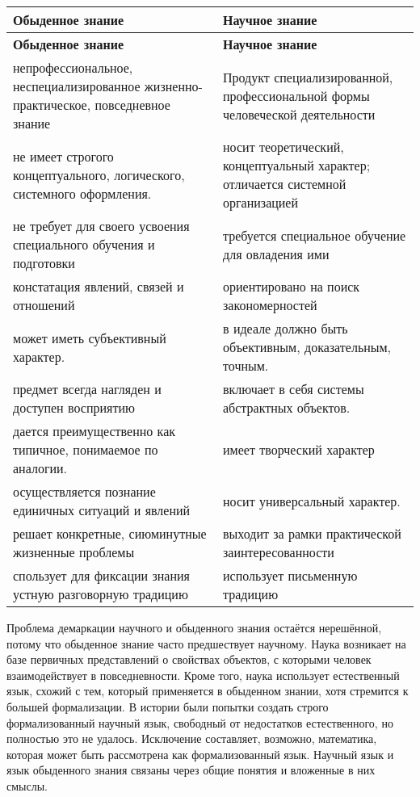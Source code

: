 \begin{longtable}{|>{\raggedright\arraybackslash}p{7cm}|>{\raggedright\arraybackslash}p{7cm}|}
\hline
\textbf{Обыденное знание} & \textbf{Научное знание} \\
\hline
\endfirsthead

\hline
\textbf{Обыденное знание} & \textbf{Научное знание} \\
\hline
\endhead

непрофессиональное, неспециализированное жизненно-практическое, повседневное знание & Продукт специализированной, профессиональной формы человеческой деятельности \\
\hline
не имеет строгого концептуального, логического, системного оформления. & носит теоретический, концептуальный характер; отличается системной организацией \\
\hline
не требует для своего усвоения специального обучения и подготовки & требуется специальное обучение для овладения ими\\
\hline
констатация явлений, связей и отношений & ориентировано на поиск закономерностей \\
\hline
может иметь субъективный характер. & в идеале должно быть объективным, доказательным, точным. \\
\hline
предмет всегда нагляден и доступен восприятию & включает в себя системы абстрактных объектов. \\
\hline
дается преимущественно как типичное, понимаемое по аналогии. & имеет творческий характер\\
\hline
осуществляется познание единичных ситуаций и явлений & носит универсальный характер. \\
\hline
решает конкретные, сиюминутные жизненные проблемы & выходит за рамки практической заинтересованности \\
\hline
спользует для фиксации знания устную разговорную традицию &  использует письменную традицию \\
\hline
\end{longtable}


Проблема демаркации научного и обыденного знания остаётся нерешённой, потому что обыденное знание часто предшествует научному. Наука возникает на базе первичных представлений о свойствах объектов, с которыми человек взаимодействует в повседневности. Кроме того, наука использует естественный язык, схожий с тем, который применяется в обыденном знании, хотя стремится к большей формализации. В истории были попытки создать строго формализованный научный язык, свободный от недостатков естественного, но полностью это не удалось. Исключение составляет, возможно, математика, которая может быть рассмотрена как формализованный язык. Научный язык и язык обыденного знания связаны через общие понятия и вложенные в них смыслы.




